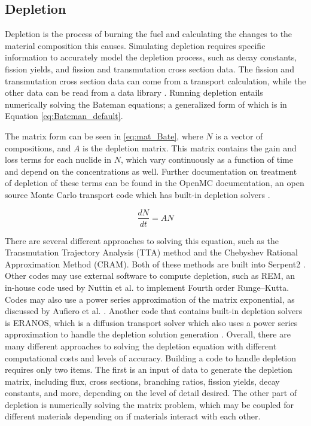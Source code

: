 \subsection{Depletion}

Depletion is the process of burning the fuel and calculating the changes to the material composition this causes. Simulating depletion requires specific information to accurately model the depletion process, such as decay constants, fission yields, and fission and transmutation cross section data. The fission and transmutation cross section data can come from a transport calculation, while the other data can be read from a data library \cite{leppanen_development_2007}. Running depletion entails numerically solving the Bateman equations; a generalized form of which is in Equation \ref{eq:Bateman_default}.

The matrix form can be seen in \eqref{eq:mat_Bate}, where $N$ is a vector of compositions, and $A$ is the depletion matrix. This matrix contains the gain and loss terms for each nuclide in $N$, which vary continuously as a function of time and depend on the concentrations as well. Further documentation on treatment of depletion of these terms can be found in the OpenMC documentation, an open source Monte Carlo transport code which has built-in depletion solvers \cite{romano_openmc_2015}.

\begin{equation}
    \frac{dN}{dt} = A N
    \label{eq:mat_Bate}
\end{equation}

There are several different approaches to solving this equation, such as the Transmutation Trajectory Analysis (TTA) method and the Chebyshev Rational Approximation Method (CRAM). Both of these methods are built into Serpent2 %
\cite{leppanen_serpent_2015}. 
Other codes may use external software to compute depletion, such as REM, an in-house code used by Nuttin et al. \cite{nuttin_potential_2005} to implement Fourth order Runge–Kutta.
Codes may also use a power series approximation of the matrix exponential, as discussed by Aufiero et al. \cite{aufiero_extended_2013}.
Another code %
that contains built-in depletion solvers is ERANOS, which is a diffusion transport solver which also uses a power series approximation to handle the depletion solution generation \cite{aufiero_extended_2013}. Overall, there are many different approaches to solving the depletion equation with different computational costs and levels of accuracy. Building a code to handle depletion requires only two items. The first is an input of data to generate the depletion matrix, including flux, cross sections, branching ratios, fission yields, decay constants, and more, depending on the level of detail desired. The other part of depletion is numerically solving the matrix problem, which may be coupled for different materials depending on if materials interact with each other.

